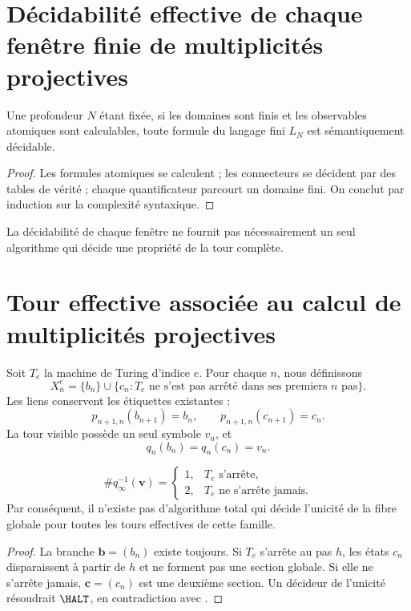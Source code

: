 \label{chap:p3-83-46-godel_turing}

\section{Décidabilité effective de chaque fenêtre finie de multiplicités projectives}

\begin{proposition}
Une profondeur \(N\) étant fixée, si les domaines sont finis et les observables
atomiques sont calculables, toute formule du langage fini
\(L_N\) est sémantiquement décidable.
\end{proposition}

\begin{proof}
Les formules atomiques se calculent ; les connecteurs se décident par des tables de
vérité ; chaque quantificateur parcourt un domaine fini. On conclut par
induction sur la complexité syntaxique.
\end{proof}

La décidabilité de chaque fenêtre ne fournit pas nécessairement un seul
algorithme qui décide une propriété de la tour complète.

\section{Tour effective associée au calcul de multiplicités projectives}

Soit \(T_e\) la machine de Turing d'indice \(e\). Pour chaque \(n\), nous définissons
\[
 X_n^e
 =
 \{b_n\}
 \cup
 \{c_n:T_e\text{ ne s'est pas arrêté dans ses premiers }n\text{ pas}\}.
\]
Les liens conservent les étiquettes existantes :
\[
  p_{n+1,n}(b_{n+1})=b_n,
  \qquad
  p_{n+1,n}(c_{n+1})=c_n.
\]
La tour visible possède un seul symbole \(v_n\), et
\[
  q_n(b_n)=q_n(c_n)=v_n.
\]

\begin{theorem}
\label{p3-83-c46-s1:thm:halt-fibre}
\[
 \#q_\infty^{-1}(\boldsymbol v)
 =
 \begin{cases}
 1,&T_e\text{ s'arrête},\\
 2,&T_e\text{ ne s'arrête jamais}.
 \end{cases}
\]
Par conséquent, il n'existe pas d'algorithme total qui décide l'unicité de la fibre
globale pour toutes les tours effectives de cette famille.
\end{theorem}

\begin{proof}
La branche \(\boldsymbol b=(b_n)\) existe toujours. Si \(T_e\) s'arrête au
pas \(h\), les états \(c_n\) disparaissent à partir de \(h\) et ne forment pas une
section globale. Si elle ne s'arrête jamais, \(\boldsymbol c=(c_n)\) est une deuxième
section. Un décideur de l'unicité résoudrait \(\HALT\), en contradiction avec
\citep{turing1936}.
\end{proof}

